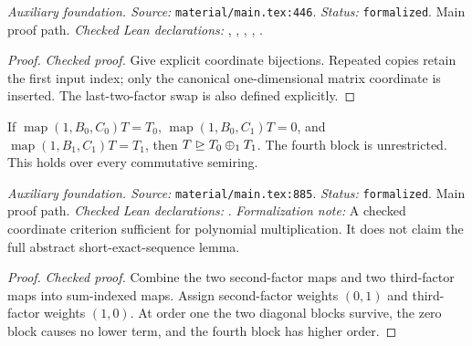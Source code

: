 \noindent\textit{Auxiliary foundation. Source:} \texttt{material/main.tex:446}.
\textit{Status:} \texttt{formalized}. Main proof path.
\textit{Checked Lean declarations:} , , , , .

\begin{proof}
\leanok
{}
\textit{Checked proof.} Give explicit coordinate bijections. Repeated copies retain the first input index; only the canonical one-dimensional matrix coordinate is inserted. The last-two-factor swap is also defined explicitly.
\end{proof}

\renewcommand{\thetheorem}{A73}
\begin{lemma}
\label{aux:split-coefficient-degeneration}
\leanok
If $\operatorname{map}(1,B_0,C_0)T=T_0$, $\operatorname{map}(1,B_0,C_1)T=0$, and $\operatorname{map}(1,B_1,C_1)T=T_1$, then $T\trianglerighteq T_0\mathbin{\oplus_1} T_1$. The fourth block is unrestricted. This holds over every commutative semiring.
\end{lemma}

\noindent\textit{Auxiliary foundation. Source:} \texttt{material/main.tex:885}.
\textit{Status:} \texttt{formalized}. Main proof path.
\textit{Checked Lean declarations:} .
\textit{Formalization note:} A checked coordinate criterion sufficient for polynomial multiplication. It does not claim the full abstract short-exact-sequence lemma.

\begin{proof}
\leanok
{}
\textit{Checked proof.} Combine the two second-factor maps and two third-factor maps into sum-indexed maps. Assign second-factor weights $(0,1)$ and third-factor weights $(1,0)$. At order one the two diagonal blocks survive, the zero block causes no lower term, and the fourth block has higher order.
\end{proof}

